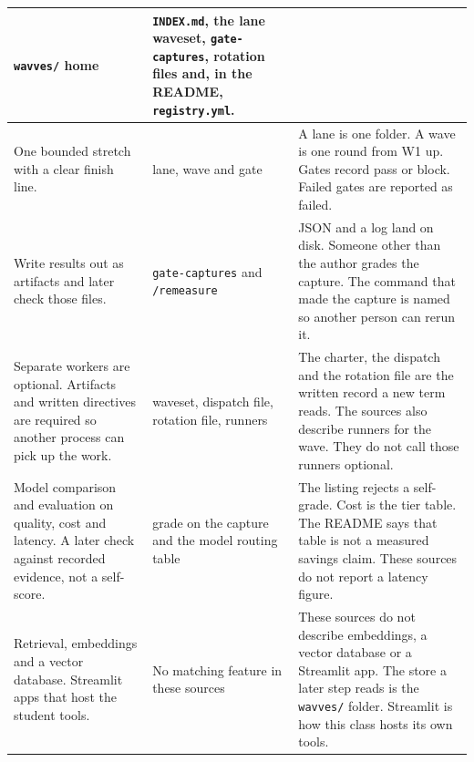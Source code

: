 \documentclass[10pt]{article}
\newcommand{\sect}[1]{%
  \par\addvspace{0.75em}%
  \noindent{\normalsize\bfseries #1}\par\nopagebreak
  \addvspace{0.2em}%
  \noindent\ignorespaces
}
\begin{document}
{\begin{longtable}{@{}>{\raggedright\arraybackslash}p{1.58in}>{\raggedright\arraybackslash}p{1.42in}>{\raggedright\arraybackslash}p{\dimexpr\textwidth-3.0in-4\tabcolsep\relax}@{}}
\texttt{wavves/} home &
\texttt{INDEX.md}, the lane waveset, \texttt{gate-captures}, rotation files and, in the README, \texttt{registry.yml}. \\
\hline
One bounded stretch with a clear finish line. &
lane, wave and gate &
A lane is one folder. A wave is one round from W1 up. Gates record pass or block. Failed gates are reported as failed. \\
\hline
Write results out as artifacts and later check those files. &
\texttt{gate-captures} and \texttt{/remeasure} &
JSON and a log land on disk. Someone other than the author grades the capture. The command that made the capture is named so another person can rerun it. \\
\hline
Separate workers are optional. Artifacts and written directives are required so another process can pick up the work. &
waveset, dispatch file, rotation file, runners &
The charter, the dispatch and the rotation file are the written record a new term reads. The sources also describe runners for the wave. They do not call those runners optional. \\
\hline
Model comparison and evaluation on quality, cost and latency. A later check against recorded evidence, not a self-score. &
grade on the capture and the model routing table &
The listing rejects a self-grade. Cost is the tier table. The README says that table is not a measured savings claim. These sources do not report a latency figure. \\
\hline
Retrieval, embeddings and a vector database. Streamlit apps that host the student tools. &
No matching feature in these sources &
These sources do not describe embeddings, a vector database or a Streamlit app. The store a later step reads is the \texttt{wavves/} folder. Streamlit is how this class hosts its own tools. \\
\hline
\end{longtable}
}
\addtocounter{table}{-1}

\sect{Model tiers recorded before a wave}
\end{document}
